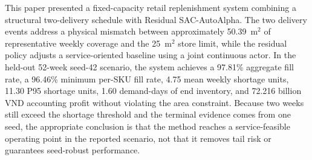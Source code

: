\documentclass[pdflatex,sn-mathphys-num]{sn-jnl}
\begin{document}
This paper presented a fixed-capacity retail replenishment system combining a structural two-delivery schedule with Residual SAC-AutoAlpha. The two delivery events address a physical mismatch between approximately 50.39~m$^2$ of representative weekly coverage and the 25~m$^2$ store limit, while the residual policy adjusts a service-oriented baseline using a joint continuous actor. In the held-out 52-week seed-42 scenario, the system achieves a 97.81\% aggregate fill rate, a 96.46\% minimum per-SKU fill rate, 4.75 mean weekly shortage units, 11.30 P95 shortage units, 1.60 demand-days of end inventory, and 72.216 billion VND accounting profit without violating the area constraint. Because two weeks still exceed the shortage threshold and the terminal evidence comes from one seed, the appropriate conclusion is that the method reaches a service-feasible operating point in the reported scenario, not that it removes tail risk or guarantees seed-robust performance.

\backmatter


\end{document}
